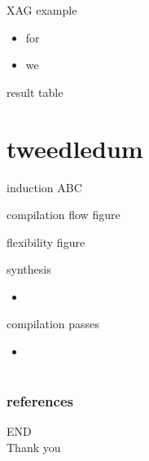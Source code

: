 \documentclass[aspectratio=1610]{beamer}
\begin{document}
\begin{frame}{XAG example}
  \begin{itemize}
    \item for
    \item we 
  \end{itemize}
\end{frame}
\begin{frame}{result}
  table   
\end{frame}

\section{tweedledum}
\begin{frame}{induction}  
  ABC 
\end{frame}
\begin{frame}{compilation flow}
  figure
\end{frame}
\begin{frame}{flexibility}
  figure
\end{frame}
\begin{frame}{synthesis}
  \begin{itemize}
    \item 
  \end{itemize}  
\end{frame}
\begin{frame}{compilation passes}
  \begin{itemize}
    \item 
  \end{itemize}
\end{frame}
\section*{}
\begin{frame}
	\frametitle{references}
	\printbibliography
\end{frame}
\begin{frame}
\centering
\Huge{END\\Thank you}
\end{frame}
\end{document}

